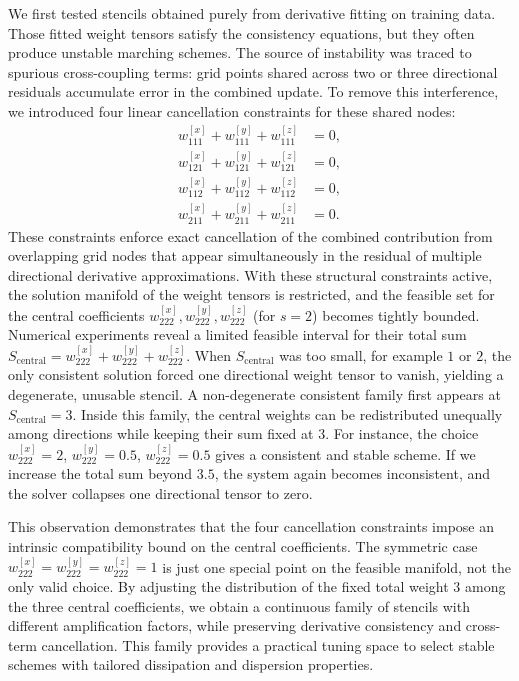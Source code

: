 \documentclass[pdflatex,sn-mathphys-num]{sn-jnl}%
\theoremstyle{thmstyleone}%
\theoremstyle{thmstyletwo}%
\theoremstyle{thmstylethree}%
\begin{document}
{We first tested stencils obtained purely from derivative fitting on training data. Those fitted weight tensors satisfy the consistency equations, but they often produce unstable marching schemes. The source of instability was traced to spurious cross-coupling terms: grid points shared across two or three directional residuals accumulate error in the combined update. To remove this interference, we introduced four linear cancellation constraints for these shared nodes:
\begin{align}
w_{111}^{[x]} + w_{111}^{[y]} + w_{111}^{[z]} &= 0,\label{E49} \\
w_{121}^{[x]} + w_{121}^{[y]} + w_{121}^{[z]} &= 0,\\
w_{112}^{[x]} + w_{112}^{[y]} + w_{112}^{[z]} &= 0,\\
w_{211}^{[x]} + w_{211}^{[y]} + w_{211}^{[z]} &= 0.\label{E52}
\end{align}
These constraints enforce exact cancellation of the combined contribution from overlapping grid nodes that appear simultaneously in the residual of multiple directional derivative approximations. With these structural constraints active, the solution manifold of the weight tensors is restricted, and the feasible set for the central coefficients $w_{222}^{[x]},w_{222}^{[y]},w_{222}^{[z]}$ (for $s=2$) becomes tightly bounded. Numerical experiments reveal a limited feasible interval for their total sum $S_{\text{central}}=w_{222}^{[x]}+w_{222}^{[y]}+w_{222}^{[z]}$. When $S_{\text{central}}$ was too small, for example $1$ or $2$, the only consistent solution forced one directional weight tensor to vanish, yielding a degenerate, unusable stencil. A non-degenerate consistent family first appears at $S_{\text{central}}=3$. Inside this family, the central weights can be redistributed unequally among directions while keeping their sum fixed at $3$. For instance, the choice $w_{222}^{[x]}=2$, $w_{222}^{[y]}=0.5$, $w_{222}^{[z]}=0.5$ gives a consistent and stable scheme. If we increase the total sum beyond $3.5$, the system again becomes inconsistent, and the solver collapses one directional tensor to zero.

This observation demonstrates that the four cancellation constraints impose an intrinsic compatibility bound on the central coefficients. The symmetric case $w_{222}^{[x]}=w_{222}^{[y]}=w_{222}^{[z]}=1$ is just one special point on the feasible manifold, not the only valid choice. By adjusting the distribution of the fixed total weight $3$ among the three central coefficients, we obtain a continuous family of stencils with different amplification factors, while preserving derivative consistency and cross-term cancellation. This family provides a practical tuning space to select stable schemes with tailored dissipation and dispersion properties.

}
\end{document}
